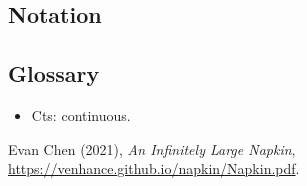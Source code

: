 \documentclass[11pt]{scrartcl}
\begin{document}
\subsection{Notation}

\subsection{Glossary}

\begin{itemize}
    \item Cts: continuous.
\end{itemize}

\begin{thebibliography}{9}
    Evan Chen (2021), \emph{An Infinitely Large Napkin}, \url{https://venhance.github.io/napkin/Napkin.pdf}.
\end{thebibliography}    
\end{document}
